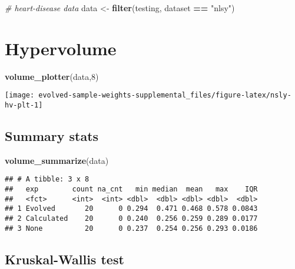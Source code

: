 \documentclass[
]{book}
\newenvironment{Shaded}{\begin{snugshade}}{\end{snugshade}}
\newcommand{\CommentTok}[1]{\textcolor[rgb]{0.56,0.35,0.01}{\textit{#1}}}
\newcommand{\DecValTok}[1]{\textcolor[rgb]{0.00,0.00,0.81}{#1}}
\newcommand{\FunctionTok}[1]{\textcolor[rgb]{0.13,0.29,0.53}{\textbf{#1}}}
\newcommand{\NormalTok}[1]{#1}
\newcommand{\OtherTok}[1]{\textcolor[rgb]{0.56,0.35,0.01}{#1}}
\newcommand{\SpecialCharTok}[1]{\textcolor[rgb]{0.81,0.36,0.00}{\textbf{#1}}}
\newcommand{\StringTok}[1]{\textcolor[rgb]{0.31,0.60,0.02}{#1}}
\begin{document}
\begin{Shaded}
\begin{Highlighting}[]
\CommentTok{\# heart{-}disease data}
\NormalTok{data }\OtherTok{\textless{}{-}} \FunctionTok{filter}\NormalTok{(testing, dataset }\SpecialCharTok{==} \StringTok{"nlsy"}\NormalTok{)}
\end{Highlighting}
\end{Shaded}

\hypertarget{hypervolume-7}{%
\section{Hypervolume}\label{hypervolume-7}}

\begin{Shaded}
\begin{Highlighting}[]
\FunctionTok{volume\_plotter}\NormalTok{(data,}\DecValTok{8}\NormalTok{)}
\end{Highlighting}
\end{Shaded}

\texttt{[image: evolved-sample-weights-supplemental\_files/figure-latex/nsly-hv-plt-1]}

\hypertarget{summary-stats-7}{%
\subsection{Summary stats}\label{summary-stats-7}}

\begin{Shaded}
\begin{Highlighting}[]
\FunctionTok{volume\_summarize}\NormalTok{(data)}
\end{Highlighting}
\end{Shaded}

\begin{verbatim}
## # A tibble: 3 x 8
##   exp        count na_cnt   min median  mean   max    IQR
##   <fct>      <int>  <int> <dbl>  <dbl> <dbl> <dbl>  <dbl>
## 1 Evolved       20      0 0.294  0.471 0.468 0.578 0.0843
## 2 Calculated    20      0 0.240  0.256 0.259 0.289 0.0177
## 3 None          20      0 0.237  0.254 0.256 0.293 0.0186
\end{verbatim}

\hypertarget{kruskal-wallis-test-7}{%
\subsection{Kruskal-Wallis test}\label{kruskal-wallis-test-7}}
\end{document}

